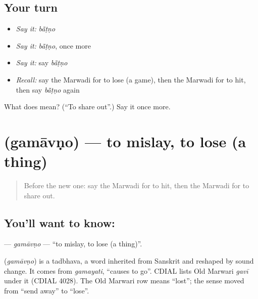 \subsection*{Your turn}
\begin{itemize}
\raggedright
  \item \emph{Say it:} \emph{bā̃ṭṇo}
  \item \emph{Say it:} \emph{bā̃ṭṇo}, once more
  \item \emph{Say it:} say \emph{bā̃ṭṇo}
  \item \emph{Recall:} say the Marwadi for to lose (a game), then the Marwadi for to hit, then say \emph{bā̃ṭṇo} again
\end{itemize}

\begin{tcolorbox}[breakable,colback=teal!4,colframe=teal!35!black,title={Before you move on}]
What does  mean? (\textquotedblleft{}To share out\textquotedblright{}.) Say it once more.
\end{tcolorbox}
\section[\texorpdfstring{\mw{गमावणो} (gamāvṇo)}{गमावणो (gamāvṇo)}]{ (gamāvṇo) — to mislay, to lose (a thing)}

\label{lesson:MW-C110-gamavno}



\begin{quote}
Before the new one: say the Marwadi for to hit, then the Marwadi for to share out.
\end{quote}

\subsection*{You'll want to know: }
\textbf{} — \emph{gamāvṇo} — \textquotedblleft{}to mislay, to lose (a thing)\textquotedblright{}.

\begin{cousinweb}
\textbf{} (\emph{gamāvṇo}) is a tadbhava, a word inherited from Sanskrit and reshaped by sound change. It comes from \emph{gamayati}, \textquotedblleft{}causes to go\textquotedblright{}. CDIAL lists Old Marwari \emph{gavī} under it (CDIAL 4028). The Old Marwari row means \textquotedblleft{}lost\textquotedblright{}; the sense moved from \textquotedblleft{}send away\textquotedblright{} to \textquotedblleft{}lose\textquotedblright{}.
\end{cousinweb}

